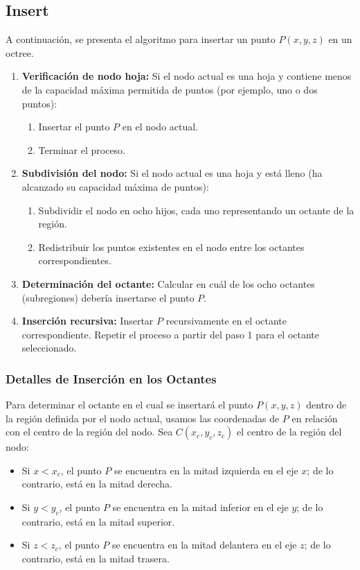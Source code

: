 \documentclass{article}
\begin{document}
\subsection{Insert}
A continuación, se presenta el algoritmo para insertar un punto \(P(x, y, z)\) en un octree. 

\begin{enumerate}
    \item \textbf{Verificación de nodo hoja:} Si el nodo actual es una hoja y contiene menos de la capacidad máxima permitida de puntos (por ejemplo, uno o dos puntos):
    \begin{enumerate}
        \item Insertar el punto \(P\) en el nodo actual.
        \item Terminar el proceso.
    \end{enumerate}
    \item \textbf{Subdivisión del nodo:} Si el nodo actual es una hoja y está lleno (ha alcanzado su capacidad máxima de puntos):
    \begin{enumerate}
        \item Subdividir el nodo en ocho hijos, cada uno representando un octante de la región.
        \item Redistribuir los puntos existentes en el nodo entre los octantes correspondientes.
    \end{enumerate}
    \item \textbf{Determinación del octante:} Calcular en cuál de los ocho octantes (subregiones) debería insertarse el punto \(P\).
    \item \textbf{Inserción recursiva:} Insertar \(P\) recursivamente en el octante correspondiente. Repetir el proceso a partir del paso 1 para el octante seleccionado.
\end{enumerate}

\subsubsection{Detalles de Inserción en los Octantes}

Para determinar el octante en el cual se insertará el punto \(P(x, y, z)\) dentro de la región definida por el nodo actual, usamos las coordenadas de \(P\) en relación con el centro de la región del nodo. Sea \(C(x_c, y_c, z_c)\) el centro de la región del nodo:

\begin{itemize}
    \item Si \(x < x_c\), el punto \(P\) se encuentra en la mitad izquierda en el eje \(x\); de lo contrario, está en la mitad derecha.
    \item Si \(y < y_c\), el punto \(P\) se encuentra en la mitad inferior en el eje \(y\); de lo contrario, está en la mitad superior.
    \item Si \(z < z_c\), el punto \(P\) se encuentra en la mitad delantera en el eje \(z\); de lo contrario, está en la mitad trasera.
\end{itemize}
\end{document}
